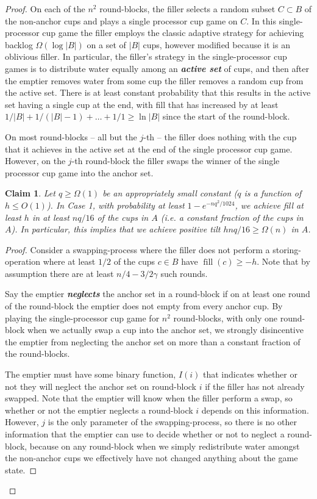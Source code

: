 \documentclass[twocolumn]{article}[10pt]
\newcommand{\defn}[1]{{\textit{\textbf{\boldmath #1}}}\xspace}
\DeclareMathOperator{\fil}{\text{fill}}
\newtheorem{clm}{Claim}
\begin{document}
\begin{proof}
On each of the $n^2$ round-blocks, the filler selects a random subset $C\subset
B$ of the non-anchor cups and plays a single processor cup game on $C$. In this
single-processor cup game the filler employs the classic adaptive strategy for
achieving backlog $\Omega(\log |B|)$ on a set of $|B|$ cups, however modified
because it is an oblivious filler. In particular, the filler's strategy in the
single-processor cup games is to distribute water equally among an \defn{active
set} of cups, and then after the emptier removes water from some cup the filler
removes a random cup from the active set. There is at least constant
probability that this results in the active set having a single cup at the end,
with fill that has increased by at least $1/|B| + 1/(|B|-1) + \ldots + 1/1 \ge
\ln |B|$ since the start of the round-block.

On most round-blocks -- all but the $j$-th -- the filler does nothing with the
cup that it achieves in the active set at the end of the single processor cup
game. However, on the $j$-th round-block the filler swaps the winner of the
single processor cup game into the anchor set.

\begin{clm} \label{clm:reg} 
  Let $q\ge \Omega(1)$ be an appropriately small constant ($q$ is a function of
  $h\le O(1)$). In Case 1, with probability at least $1-e^{-nq^2/1024}$, we
  achieve fill at least $h$ in at least $nq/16$ of the cups in $A$ (i.e. a
  constant fraction of the cups in $A$). In particular, this implies that we
  achieve positive tilt $hnq/16 \ge \Omega(n)$ in $A$.
\end{clm}
\begin{proof}
  Consider a swapping-process where the filler does not perform a
  storing-operation where at least $1/2$ of the cups $c \in B$ have $\fil(c)
  \ge -h$. Note that by assumption there are at least $n/4 - 3/2 \gamma$ such rounds.
 
  Say the emptier \defn{neglects} the anchor set in a round-block if on at
  least one round of the round-block the emptier does not empty from every
  anchor cup. By playing the single-processor cup game for $n^2$ round-blocks,
  with only one round-block when we actually swap a cup into the anchor set, we
  strongly disincentive the emptier from neglecting the anchor set on more
  than a constant fraction of the round-blocks. 

  The emptier must have some binary function, $I(i)$ that indicates whether or
  not they will neglect the anchor set on round-block $i$ if the filler has not
  already swapped. Note that the emptier will know when the filler perform a
  swap, so whether or not the emptier neglects a round-block $i$ depends on
  this information. However, $j$ is the only parameter of the swapping-process,
  so there is no other information that the emptier can use to decide whether
  or not to neglect a round-block, because on any round-block when we simply
  redistribute water amongst the non-anchor cups we effectively have not
  changed anything about the game state. 


\end{proof}
\end{proof}
\end{document}
